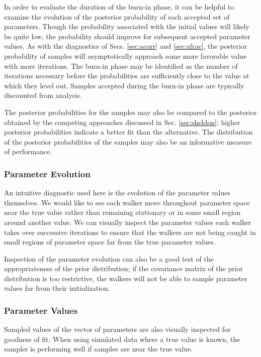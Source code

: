 \documentclass[preprint]{aastex}
\begin{document}
In order to evaluate the duration of the burn-in phase, it can be helpful to examine the evolution of the posterior probability of each accepted set of parameters.  Though the probability associated with the initial values will likely be quite low, the probability should improve for subsequent accepted parameter values.  As with the diagnostics of Secs. \ref{sec:acorr} and \ref{sec:afrac}, the posterior probability of samples will asymptotically approach some more favorable value with more iterations.  The burn-in phase may be identified as the number of iterations necessary before the probabilities are sufficiently close to the value at which they level out.  Samples accepted during the burn-in phase are typically discounted from analysis.  

The posterior probabilities for the samples may also be compared to the posterior obtained by the competing approaches discussed in Sec. \ref{sec:sheldon}; higher posterior probabilities indicate a better fit than the alternative.  The distribution of the posterior probabilities of the samples may also be an informative measure of performance.

\clearpage
\subsubsection{Parameter Evolution}
\label{sec:params}

An intuitive diagnostic used here is the evolution of the parameter values themselves.  We would like to see each walker move throughout parameter space near the true value rather than remaining stationary or in some small region around another value.  We can visually inspect the parameter values each walker takes over successive iterations to ensure that the walkers are not being caught in small regions of parameter space far from the true parameter values.  

Inspection of the parameter evolution can also be a good test of the appropriateness of the prior distribution; if the covariance matrix of the prior distribution is too restrictive, the walkers will not be able to sample parameter values far from their initialization.  

\clearpage
\subsubsection{Parameter Values}
\label{sec:samps}

Sampled values of the vector of parameters are also visually inspected for goodness of fit.  When using simulated data where a true value is known, the sampler is performing well if samples are near the true value.  
\end{document}
